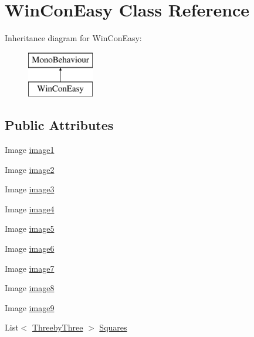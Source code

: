 \hypertarget{class_win_con_easy}{}\section{Win\+Con\+Easy Class Reference}
\label{class_win_con_easy}
Inheritance diagram for Win\+Con\+Easy\+:\begin{figure}[H]
\begin{center}
\leavevmode
\includegraphics[height=2.000000cm]{class_win_con_easy}
\end{center}
\end{figure}
\subsection*{Public Attributes}
\begin{DoxyCompactItemize}
\item 
Image \mbox{\hyperlink{class_win_con_easy_aa76814d778c330ae809f88c49669d1ac}{image1}}
\item 
Image \mbox{\hyperlink{class_win_con_easy_aa1f7ca6bb50c52c27fd0a5133e1dab04}{image2}}
\item 
Image \mbox{\hyperlink{class_win_con_easy_a7e977b46ff648225ae0266455a401c1f}{image3}}
\item 
Image \mbox{\hyperlink{class_win_con_easy_a47d9616fefba9bb130086a26fed4b416}{image4}}
\item 
Image \mbox{\hyperlink{class_win_con_easy_a33d3d74457b53c7ce4ad0c1879000fea}{image5}}
\item 
Image \mbox{\hyperlink{class_win_con_easy_af8d39251637fd9f2a683cc52469523de}{image6}}
\item 
Image \mbox{\hyperlink{class_win_con_easy_a07bb584530b0ed6bfc5409c8ef49735b}{image7}}
\item 
Image \mbox{\hyperlink{class_win_con_easy_a28af7c9f0a88c29d3c4b533c292e8a5f}{image8}}
\item 
Image \mbox{\hyperlink{class_win_con_easy_a151d80044f369798d5d6815638419d87}{image9}}
\item 
List$<$ \mbox{\hyperlink{class_threeby_three}{Threeby\+Three}} $>$ \mbox{\hyperlink{class_win_con_easy_a019dbd53b02d223d6c56059339a1627c}{Squares}}
\end{DoxyCompactItemize}


